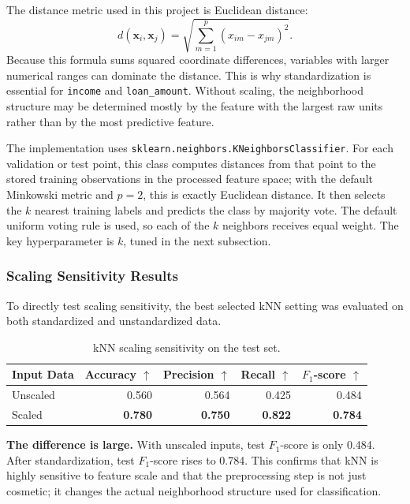 \documentclass[12pt]{article}
\newcommand{\best}[1]{\textbf{#1}}
\begin{document}
The distance metric used in this project is Euclidean distance:
\[
    d(\mathbf{x}_i,\mathbf{x}_j)
    =
    \sqrt{\sum_{m=1}^{p}(x_{im}-x_{jm})^2}.
\]
Because this formula sums squared coordinate differences, variables with larger numerical ranges can dominate the distance. This is why standardization is essential for \texttt{income} and \texttt{loan\_amount}. Without scaling, the neighborhood structure may be determined mostly by the feature with the largest raw units rather than by the most predictive feature.

The implementation uses \texttt{sklearn.neighbors.KNeighborsClassifier}. For each validation or test point, this class computes distances from that point to the stored training observations in the processed feature space; with the default Minkowski metric and $p=2$, this is exactly Euclidean distance. It then selects the $k$ nearest training labels and predicts the class by majority vote. The default uniform voting rule is used, so each of the $k$ neighbors receives equal weight. The key hyperparameter is $k$, tuned in the next subsection.

\subsubsection{Scaling Sensitivity Results}

To directly test scaling sensitivity, the best selected kNN setting was evaluated on both standardized and unstandardized data.

\begin{table}[htbp]
\centering
\caption{kNN scaling sensitivity on the test set.}
\begin{tabular}{lrrrr}
\toprule
Input Data & Accuracy $\uparrow$ & Precision $\uparrow$ & Recall $\uparrow$ & $F_1$-score $\uparrow$ \\
\midrule
Unscaled & 0.560 & 0.564 & 0.425 & 0.484 \\
Scaled & \best{0.780} & \best{0.750} & \best{0.822} & \best{0.784} \\
\bottomrule
\end{tabular}
\end{table}

\textbf{The difference is large.} With unscaled inputs, test $F_1$-score is only 0.484. After standardization, test $F_1$-score rises to 0.784. This confirms that kNN is highly sensitive to feature scale and that the preprocessing step is not just cosmetic; it changes the actual neighborhood structure used for classification.
\end{document}
